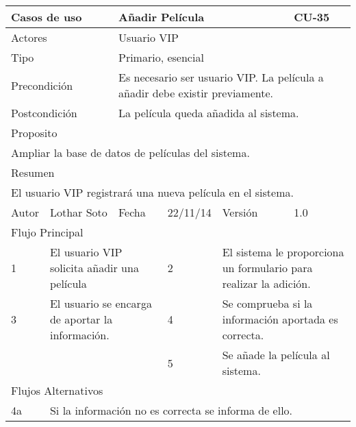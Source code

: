 \documentclass{article}
\begin{document}
\begin{table}[h]
\begin{tabular}{|l|l|l|l|l|l|}
\hline
\multicolumn{2}{|p{2cm}|}{Casos de uso}  & \multicolumn{3}{p{7cm}|}{Añadir Película} & CU-35 \\
\hline
\multicolumn{2}{|p{2cm}|}{Actores}       & \multicolumn{4}{p{8cm}|}{Usuario VIP}        \\
\hline
\multicolumn{2}{|p{2cm}|}{Tipo}          & \multicolumn{4}{p{8cm}|}{Primario, esencial}        \\
\hline
\multicolumn{2}{|p{2cm}|}{Precondición}  & \multicolumn{4}{p{8cm}|}{Es necesario ser usuario VIP. La película a añadir debe existir previamente.}        \\
\hline
\multicolumn{2}{|p{2cm}|}{Postcondición} & \multicolumn{4}{p{8cm}|}{La película queda añadida al sistema.}        \\
\hline
\multicolumn{6}{|p{10cm}|}{Proposito}                                   \\
\hline
\multicolumn{6}{|p{10cm}|}{Ampliar la base de datos de películas del sistema.}                                            \\
\hline
\multicolumn{6}{|p{10cm}|}{Resumen}                                 \\
\hline
\multicolumn{6}{|p{10cm}|}{El usuario VIP registrará una nueva película en el sistema.}                                            \\
\hline
Autor         &       Lothar Soto        &  Fecha   &  22/11/14   &   Versión  & 1.0\\
\hline
\multicolumn{6}{|p{10cm}|}{Flujo Principal}\\
\hline
\multicolumn{1}{|p{1cm}|}{1} & \multicolumn{2}{p{3cm}}{El usuario VIP solicita añadir una película} & \multicolumn{1}{|p{1cm}|}{2} & \multicolumn{2}{p{3cm}|}{El sistema le proporciona un formulario para realizar la adición.}\\
\hline
\multicolumn{1}{|p{1cm}|}{3} & \multicolumn{2}{p{3cm}}{El usuario se encarga de aportar la información.} & \multicolumn{1}{|p{1cm}|}{4} & \multicolumn{2}{p{3cm}|}{Se comprueba si la información aportada es correcta.}\\
\hline
\multicolumn{1}{|p{1cm}|}{} & \multicolumn{2}{p{3cm}}{} & \multicolumn{1}{|p{1cm}|}{5} & \multicolumn{2}{p{3cm}|}{Se añade la película al sistema.}\\
\hline
\multicolumn{6}{|p{10cm}|}{Flujos Alternativos}\\
\hline
\multicolumn{1}{|p{1cm}}{4a} & \multicolumn{5}{|p{9cm}|}{Si la información no es correcta se informa de ello.}\\

\end{tabular}
\end{table}
\end{document}
